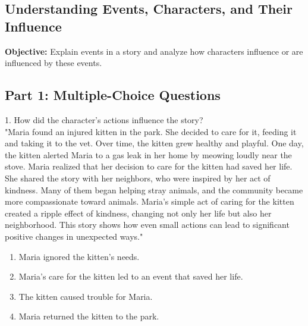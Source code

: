\documentclass[12pt]{article}
\begin{document}
\subsection*{Understanding Events, Characters, and Their Influence}
\onehalfspacing

\begin{tcolorbox}[colframe=black!40, colback=gray!0, title=Learning Objective]
\textbf{Objective:} Explain events in a story and analyze how characters influence or are influenced by these events.
\end{tcolorbox}

\subsection*{Part 1: Multiple-Choice Questions}

1. How did the character's actions influence the story?\\
"Maria found an injured kitten in the park. She decided to care for it, feeding it and taking it to the vet. Over time, the kitten grew healthy and playful. One day, the kitten alerted Maria to a gas leak in her home by meowing loudly near the stove. Maria realized that her decision to care for the kitten had saved her life. She shared the story with her neighbors, who were inspired by her act of kindness. Many of them began helping stray animals, and the community became more compassionate toward animals. Maria’s simple act of caring for the kitten created a ripple effect of kindness, changing not only her life but also her neighborhood. This story shows how even small actions can lead to significant positive changes in unexpected ways."\\
\begin{enumerate}[label=\Alph*.]
    \item Maria ignored the kitten’s needs.  
    \item Maria’s care for the kitten led to an event that saved her life.  
    \item The kitten caused trouble for Maria.  
    \item Maria returned the kitten to the park.  
\end{enumerate}
\end{document}
